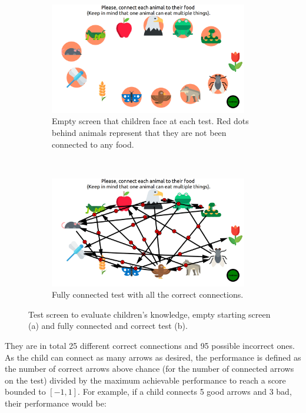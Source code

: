 \begin{figure}[ht]
	\centering
	\begin{subfigure}[t]{0.5\textwidth}
		\centering
		\includegraphics[width=0.95\textwidth]{empty_graph.png}
		\captionsetup{width=.95\linewidth}
		\caption{Empty screen that children face at each test. Red dots behind animals represent that they are not been connected to any food.}
	\end{subfigure}%
	~ 
	\begin{subfigure}[t]{0.5\textwidth}
		\centering
		\includegraphics[width=0.95\textwidth]{full_graph.png}
		\captionsetup{width=.95\linewidth}
		\caption{Fully connected test with all the correct connections.}
	\end{subfigure}
	\caption{Test screen to evaluate children's knowledge, empty starting screen (a) and fully connected and correct test (b).}
	\label{fig:test}
\end{figure}

They are in total 25 different correct connections and 95 possible incorrect ones. As the child can connect as many arrows as desired, the performance is defined as the number of correct arrows above chance (for the number of connected arrows on the test) divided by the maximum achievable performance to reach a score bounded to $[-1,1]$. For example, if a child connects 5 good arrows and 3 bad, their performance would be:

